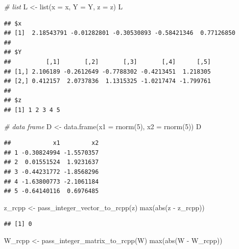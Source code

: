 \documentclass[
]{book}
\newenvironment{Shaded}{\begin{snugshade}}{\end{snugshade}}
\newcommand{\AttributeTok}[1]{\textcolor[rgb]{0.77,0.63,0.00}{#1}}
\newcommand{\CommentTok}[1]{\textcolor[rgb]{0.56,0.35,0.01}{\textit{#1}}}
\newcommand{\DecValTok}[1]{\textcolor[rgb]{0.00,0.00,0.81}{#1}}
\newcommand{\FunctionTok}[1]{\textcolor[rgb]{0.00,0.00,0.00}{#1}}
\newcommand{\NormalTok}[1]{#1}
\newcommand{\OtherTok}[1]{\textcolor[rgb]{0.56,0.35,0.01}{#1}}
\newcommand{\SpecialCharTok}[1]{\textcolor[rgb]{0.00,0.00,0.00}{#1}}
\begin{document}
\begin{Shaded}
\begin{Highlighting}[]
\CommentTok{\# list}
\NormalTok{L }\OtherTok{\textless{}{-}} \FunctionTok{list}\NormalTok{(}\AttributeTok{x =}\NormalTok{ x, }\AttributeTok{Y =}\NormalTok{ Y, }\AttributeTok{z =}\NormalTok{ z)}
\NormalTok{L}
\end{Highlighting}
\end{Shaded}

\begin{verbatim}
## $x
## [1]  2.18543791 -0.01282801 -0.30530893 -0.58421346  0.77126850
## 
## $Y
##          [,1]       [,2]       [,3]       [,4]      [,5]
## [1,] 2.106189 -0.2612649 -0.7788302 -0.4213451  1.218305
## [2,] 0.412157  2.0737836  1.1315325 -1.0217474 -1.799761
## 
## $z
## [1] 1 2 3 4 5
\end{verbatim}

\begin{Shaded}
\begin{Highlighting}[]
\CommentTok{\# data frame}
\NormalTok{D }\OtherTok{\textless{}{-}} \FunctionTok{data.frame}\NormalTok{(}\AttributeTok{x1 =} \FunctionTok{rnorm}\NormalTok{(}\DecValTok{5}\NormalTok{), }\AttributeTok{x2 =} \FunctionTok{rnorm}\NormalTok{(}\DecValTok{5}\NormalTok{))}
\NormalTok{D}
\end{Highlighting}
\end{Shaded}

\begin{verbatim}
##            x1         x2
## 1 -0.30824994 -1.5570357
## 2  0.01551524  1.9231637
## 3 -0.44231772 -1.8568296
## 4 -1.63800773 -2.1061184
## 5 -0.64140116  0.6976485
\end{verbatim}

\begin{Shaded}
\begin{Highlighting}[]
\NormalTok{z\_rcpp }\OtherTok{\textless{}{-}} \FunctionTok{pass\_integer\_vector\_to\_rcpp}\NormalTok{(z)}
\FunctionTok{max}\NormalTok{(}\FunctionTok{abs}\NormalTok{(z }\SpecialCharTok{{-}}\NormalTok{ z\_rcpp))}
\end{Highlighting}
\end{Shaded}

\begin{verbatim}
## [1] 0
\end{verbatim}

\begin{Shaded}
\begin{Highlighting}[]
\NormalTok{W\_rcpp }\OtherTok{\textless{}{-}} \FunctionTok{pass\_integer\_matrix\_to\_rcpp}\NormalTok{(W)}
\FunctionTok{max}\NormalTok{(}\FunctionTok{abs}\NormalTok{(W }\SpecialCharTok{{-}}\NormalTok{ W\_rcpp))}
\end{Highlighting}
\end{Shaded}
\end{document}

